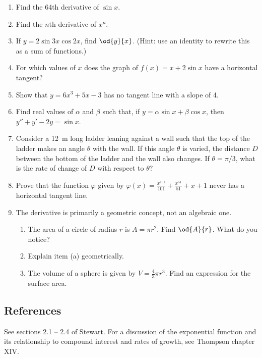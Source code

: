 \begin{enumerate}
  \item Find the 64th derivative of $ \sin x $.
  \item Find the $ n$th derivative of $ x^n $.
  \item If $ y = 2\sin 3x \cos 2x $, find $ \od{y}{x} $. (Hint: use an identity to rewrite this as a sum of functions.)
  \item For which values of $ x $ does the graph of $ f(x) = x + 2\sin x $ have a horizontal tangent?
  \item Show that $ y = 6x^3 + 5x - 3 $ has no tangent line with a slope of 4.
  \item Find real values of $ \alpha $ and $ \beta $ such that, if $ y = \alpha \sin x + \beta \cos x $,
        then $ y'' + y' -2y = \sin x $.
  \item Consider a \SI{12}{\metre} long ladder leaning against a wall such that the top of the ladder makes an
        angle $ \theta $ with the wall. If this angle $ \theta $ is varied, the distance $ D $ between the bottom
        of the ladder and the wall also changes. If $ \theta = \pi/3 $, what is the rate of change of $ D $ with
        respect to $ \theta $?
  \item Prove that the function $ \varphi $ given by $ \varphi(x) = \frac{x^{101}}{101} + \frac{x^{51}}{51} + x + 1 $
        never has a horizontal tangent line.
  \item The derivative is primarily a geometric concept, not an algebraic one.
    \begin{enumerate}
      \item The area of a circle of radius $ r $ is $ A = \pi r^2 $. Find $ \od{A}{r} $. What do you notice?
      \item Explain item (a) geometrically.
      \item The volume of a sphere is given by $ V = \frac{4}{3} \pi r^3 $. Find an expression for the surface area.
    \end{enumerate}
\end{enumerate}

\subsection{References}
See sections 2.1 -- 2.4 of Stewart. For a discussion of the exponential function and its
relationship to compound interest and rates of growth, see Thompson chapter XIV.

